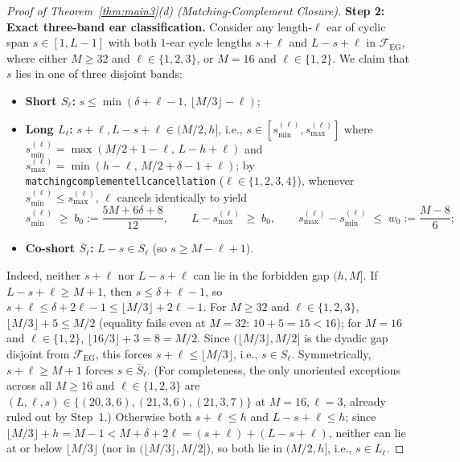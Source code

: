 \documentclass[11pt,reqno]{amsart}
\theoremstyle{plain}
\theoremstyle{definition}
\theoremstyle{remark}
\newcommand{\FEG}{\mathcal{F}_{\mathrm{EG}}}
\DeclareRobustCommand{\_}{\ifmmode\text{\textunderscore}\else\textunderscore\allowbreak\fi}
\begin{document}
\begin{proof}[Proof of Theorem~\ref{thm:main3}(d) (Matching-Complement Closure)]
\medskip
\noindent\textbf{Step 2: Exact three-band ear classification.}
Consider any length-$\ell$ ear of cyclic span $s \in [1, L - 1]$ with both $1$-ear cycle lengths $s + \ell$ and $L - s + \ell$ in $\FEG$, where either $M \ge 32$ and $\ell \in \{1, 2, 3\}$, or $M = 16$ and $\ell \in \{1, 2\}$. We claim that $s$ lies in one of three disjoint bands:
\begin{itemize}[leftmargin=1.6em]
  \item \textbf{Short $S_\ell$:} $s \le \min(\delta + \ell - 1,\, \lfloor M/3 \rfloor - \ell)$;
  \item \textbf{Long $L_\ell$:} $s + \ell, L - s + \ell \in (M/2, h]$, i.e., $s \in [s_{\min}^{(\ell)}, s_{\max}^{(\ell)}]$ where $s_{\min}^{(\ell)} = \max(M/2 + 1 - \ell,\, L - h + \ell)$ and $s_{\max}^{(\ell)} = \min(h - \ell,\, M/2 + \delta - 1 + \ell)$; by \texttt{matching\_complement\_ell\_cancellation} ($\ell \in \{1, 2, 3, 4\}$), whenever $s_{\min}^{(\ell)} \le s_{\max}^{(\ell)}$, $\ell$ cancels identically to yield
  \[
    s_{\min}^{(\ell)} \;\ge\; b_0 := \frac{5M + 6\delta + 8}{12}, \qquad L - s_{\max}^{(\ell)} \;\ge\; b_0, \qquad s_{\max}^{(\ell)} - s_{\min}^{(\ell)} \;\le\; w_0 := \frac{M - 8}{6};
  \]
  \item \textbf{Co-short $\bar{S}_\ell$:} $L - s \in S_\ell$ (so $s \ge M - \ell + 1$).
\end{itemize}
Indeed, neither $s + \ell$ nor $L - s + \ell$ can lie in the forbidden gap $(h, M]$. If $L - s + \ell \ge M + 1$, then $s \le \delta + \ell - 1$, so $s + \ell \le \delta + 2\ell - 1 \le \lfloor M/3 \rfloor + 2\ell - 1$. For $M \ge 32$ and $\ell \in \{1, 2, 3\}$, $\lfloor M/3 \rfloor + 5 \le M/2$ (equality fails even at $M = 32$: $10 + 5 = 15 < 16$); for $M = 16$ and $\ell \in \{1, 2\}$, $\lfloor 16/3 \rfloor + 3 = 8 = M/2$. Since $(\lfloor M/3 \rfloor, M/2]$ is the dyadic gap disjoint from $\FEG$, this forces $s + \ell \le \lfloor M/3 \rfloor$, i.e., $s \in S_\ell$. Symmetrically, $s + \ell \ge M + 1$ forces $s \in \bar{S}_\ell$. (For completeness, the only unoriented exceptions across all $M \ge 16$ and $\ell \in \{1, 2, 3\}$ are $(L, \ell, s) \in \{(20, 3, 6), (21, 3, 6), (21, 3, 7)\}$ at $M = 16, \ell = 3$, already ruled out by Step~1.) Otherwise both $s + \ell \le h$ and $L - s + \ell \le h$; since $\lfloor M/3 \rfloor + h = M - 1 < M + \delta + 2\ell = (s + \ell) + (L - s + \ell)$, neither can lie at or below $\lfloor M/3 \rfloor$ (nor in $(\lfloor M/3 \rfloor, M/2]$), so both lie in $(M/2, h]$, i.e., $s \in L_\ell$.


\end{proof}
\end{document}
